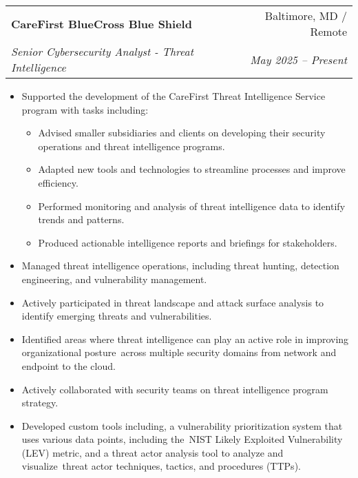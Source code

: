 \documentclass[letterpaper,11pt]{article}
\makeatletter
\newcommand{\resumeSubheading}[4]{
  \vspace{-1pt}\item
    \begin{tabular*}{0.97\textwidth}[t]{l@{\extracolsep{\fill}}r}
      \textbf{#1} & #2 \\
      \textit{\small#3} & \textit{\small #4} \\
    \end{tabular*}\vspace{-5pt}
}
\newcommand{\resumeItemListStart}{\begin{itemize}[nosep]}
\newcommand{\resumeItemListEnd}{\end{itemize}\vspace{-5pt}}
\makeatother
\begin{document}
\resumeSubheading
{CareFirst BlueCross Blue Shield}{Baltimore, MD / Remote}
{Senior Cybersecurity Analyst - Threat Intelligence}{May 2025 -- Present}
\resumeItemListStart
\item Supported the development of the CareFirst Threat Intelligence Service program with tasks including:
\begin{itemize}[nosep]
  \item Advised smaller subsidiaries and clients on developing their security operations and threat intelligence programs.
  \item Adapted new tools and technologies to streamline processes and improve efficiency.
  \item Performed monitoring and analysis of threat intelligence data to identify trends and patterns.
  \item Produced actionable intelligence reports and briefings for stakeholders.
\end{itemize}
\item Managed threat intelligence operations, including threat hunting, detection engineering, and vulnerability management.
\item Actively participated in threat landscape and attack surface analysis to identify emerging threats and vulnerabilities.
\item Identified areas where threat intelligence can play an active role in improving organizational posture\
across multiple security domains from network and endpoint to the cloud.
\item Actively collaborated with security teams on threat intelligence program strategy.
\item Developed custom tools including, a vulnerability prioritization system that uses various data points, including the\
NIST Likely Exploited Vulnerability (LEV) metric, and a threat actor analysis tool to analyze and visualize\
threat actor techniques, tactics, and procedures (TTPs).
\resumeItemListEnd
\end{document}
